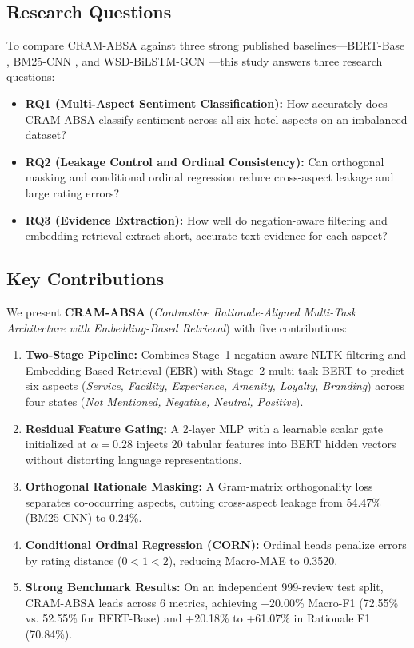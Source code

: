 \documentclass[pdflatex,sn-mathphys-num]{sn-jnl}%
\theoremstyle{thmstyleone}%
\theoremstyle{thmstyletwo}%
\theoremstyle{thmstylethree}%
\begin{document}
\subsection{Research Questions}
\label{subsec:research_questions}
To compare CRAM-ABSA against three strong published baselines---BERT-Base \cite{ref01_bimaputra2023}, BM25-CNN \cite{ref04_namee2023}, and WSD-BiLSTM-GCN \cite{ref09_nadeem2025}---this study answers three research questions:
\begin{itemize}
    \item \textbf{RQ1 (Multi-Aspect Sentiment Classification):} How accurately does CRAM-ABSA classify sentiment across all six hotel aspects on an imbalanced dataset?
    \item \textbf{RQ2 (Leakage Control and Ordinal Consistency):} Can orthogonal masking and conditional ordinal regression reduce cross-aspect leakage and large rating errors?
    \item \textbf{RQ3 (Evidence Extraction):} How well do negation-aware filtering and embedding retrieval extract short, accurate text evidence for each aspect?
\end{itemize}

\subsection{Key Contributions}
\label{subsec:key_contributions}
We present \textbf{CRAM-ABSA} (\textit{Contrastive Rationale-Aligned Multi-Task Architecture with Embedding-Based Retrieval}) with five contributions:
\begin{enumerate}[label=(\roman*)]
    \item \textbf{Two-Stage Pipeline:} Combines Stage~1 negation-aware NLTK filtering and Embedding-Based Retrieval (EBR) with Stage~2 multi-task BERT to predict six aspects (\textit{Service, Facility, Experience, Amenity, Loyalty, Branding}) across four states (\textit{Not Mentioned, Negative, Neutral, Positive}).
    \item \textbf{Residual Feature Gating:} A 2-layer MLP with a learnable scalar gate initialized at $\alpha = 0.28$ injects 20 tabular features into BERT hidden vectors without distorting language representations.
    \item \textbf{Orthogonal Rationale Masking:} A Gram-matrix orthogonality loss separates co-occurring aspects, cutting cross-aspect leakage from 54.47\% (BM25-CNN) to 0.24\%.
    \item \textbf{Conditional Ordinal Regression (CORN):} Ordinal heads penalize errors by rating distance ($0 < 1 < 2$), reducing Macro-MAE to 0.3520.
    \item \textbf{Strong Benchmark Results:} On an independent 999-review test split, CRAM-ABSA leads across 6 metrics, achieving +20.00\% Macro-F1 (72.55\% vs. 52.55\% for BERT-Base) and +20.18\% to +61.07\% in Rationale F1 (70.84\%).
\end{enumerate}
\end{document}
